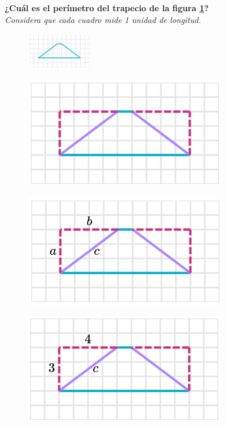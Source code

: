 \textbf{¿Cuál es el perímetro del trapecio de la figura \ref{fig:peri_trap_03}?}\\
\emph{Considera que cada cuadro mide 1 unidad de longitud.}

\begin{figure}[H]
    \centering
    \includegraphics[width=0.25\textwidth]{../images/peri_trap_03}
    \caption{}
    \label{fig:peri_trap_03}
\end{figure}


\begin{solutionbox}{10cm}
    \begin{minipage}{0.95\textwidth}
        \begin{figure}[H]
            \centering
            \includegraphics[width=0.25\linewidth]{../images/peri_trap_03a.png}
            \caption{}
            \label{fig:peri_trap_03a}
        \end{figure}
        \begin{figure}[H]
            \centering
            \includegraphics[width=0.25\linewidth]{../images/peri_trap_03b.png}
            \caption{}
            \label{fig:peri_trap_03b}
        \end{figure}
        \begin{figure}[H]
            \centering
            \includegraphics[width=0.25\linewidth]{../images/peri_trap_03c.png}
            \caption{}
            \label{fig:peri_trap_03c}
        \end{figure}
        \begin{figure}[H]

\end{figure}
\end{minipage}
\end{solutionbox}
